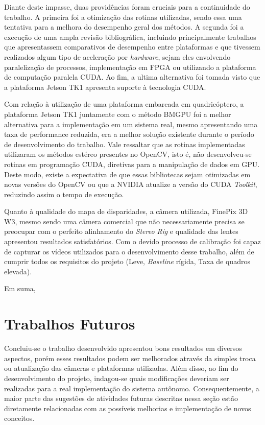Diante deste impasse, duas providências foram cruciais para a continuidade do trabalho. A primeira foi a otimização das rotinas utilizadas, sendo essa uma tentativa para a melhora do desempenho geral dos métodos. A segunda foi a execução de uma ampla revisão bibliográfica, incluindo principalmente trabalhos que apresentassem comparativos de desempenho entre plataformas e que tivessem realizados algum tipo de aceleração por \textit{hardware}, sejam eles envolvendo paralelização de processos, implementação em FPGA ou utilizando a plataforma de computação paralela CUDA. Ao fim, a ultima alternativa foi tomada visto que a plataforma Jetson TK1 apresenta suporte à tecnologia CUDA.

Com relação à utilização de uma plataforma embarcada em quadricóptero, a plataforma Jetson TK1 juntamente com o método BMGPU foi a melhor alternativa para a implementação em um sistema real, mesmo apresentando uma taxa de performance reduzida, era a melhor solução existente durante o período de desenvolvimento do trabalho. Vale ressaltar que as rotinas implementadas utilizaram os métodos estéreo presentes no OpenCV, isto é, não desenvolveu-se rotinas em programação CUDA, diretivas para a manipulação de dados em GPU. Deste modo, existe a expectativa de que essas bibliotecas sejam otimizadas em novas versões do OpenCV ou que a NVIDIA atualize a versão do CUDA \textit{Toolkit}, reduzindo assim o tempo de execução.

Quanto à qualidade do mapa de disparidades, a câmera utilizada, FinePix 3D W3, mesmo sendo uma câmera comercial que não necessariamente precisa se preocupar com o perfeito alinhamento do \textit{Stereo Rig} e qualidade das lentes apresentou resultados satisfatórios. Com o devido processo de calibração foi capaz de capturar os vídeos utilizados para o desenvolvimento desse trabalho, além de cumprir todos os requisitos do projeto (Leve, \textit{Baseline} rígida, Taxa de quadros elevada).

Em suma, 

\section{Trabalhos Futuros}

Concluiu-se o trabalho desenvolvido apresentou bons resultados em diversos aspectos, porém esses resultados podem ser melhorados através da simples troca ou atualização das câmeras e plataformas utilizadas. Além disso, ao fim do desenvolvimento do projeto, indagou-se quais modificações deveriam ser realizadas para a real implementação do sistema autônomo. Consequentemente, a maior parte das sugestões de atividades futuras descritas nessa seção estão diretamente relacionadas com as possíveis melhorias e implementação de novos conceitos.

